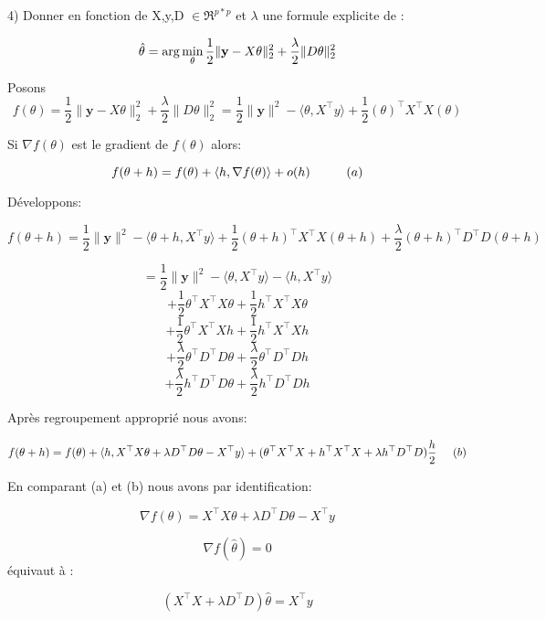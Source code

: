 4) Donner en fonction de X,y,D $\in {\Re}^{p*p}$  et $\lambda$ une formule  explicite de :

$$\hat \theta={\rm arg} \displaystyle\min_{\theta} \frac{1}{2}\| \mathbf{y} -X \theta \|_2^2+ \frac{\lambda}{2}\|D\theta\|_2^2$$

Posons $$ f(\theta) = \frac{1}{2}\| \mathbf{y} -X \theta \|_2^2+ \frac{\lambda}{2}\|D\theta\|_2^2 = \frac{1}{2}\| \mathbf{y}\|^2 - \langle \theta,X^\top y \rangle + \frac{1}{2} (\theta)^\top X^\top X (\theta)$$
       
Si  $\nabla f(\theta)$ est le gradient de $f(\theta)$ alors:


$$f(\theta + h)=f(\theta) +\langle h,\nabla f(\theta) \rangle  + o(h)   \hspace{5mm} \hspace{5mm} (a)$$ 


Développons:

$$f(\theta+ h)= \frac{1}{2}\| \mathbf{y}\|^2 - \langle \theta+h,X^\top y \rangle + \frac{1}{2} (\theta+h)^\top X^\top X (\theta+h)+ \frac{\lambda}{2}(\theta+h)^\top D^\top D (\theta+h)$$

$$=\frac{1}{2}\| \mathbf{y}\|^2-\langle \theta,X^\top y \rangle - \langle h,X^\top y \rangle$$
$$+\frac{1}{2} \theta^\top X^\top X \theta+\frac{1}{2} h^\top X^\top X \theta$$
$$+\frac{1}{2} \theta^\top X^\top X h+\frac{1}{2} h^\top X^\top X h $$
$$+ \frac{\lambda}{2} \theta^\top D^\top D \theta+\frac{\lambda}{2} \theta^\top D^\top D h$$
$$+\frac{\lambda}{2} h^\top D^\top D \theta +\frac{\lambda}{2} h^\top D^\top D h$$

Après regroupement approprié nous avons:

$$f(\theta+ h)= f(\theta)+\langle h,X^\top X \theta+\lambda D^\top D \theta - X^\top y \rangle+(\theta^\top X^\top X+h^\top X^\top X+\lambda h^\top D^\top D )\frac{h}{2} \hspace{5mm} (b)$$

En comparant (a) et (b) nous avons par identification:

$$\nabla f(\theta) = X^\top X \theta + \lambda D^\top D \theta - X^\top y $$

$$\nabla f(\hat \theta)=0$$ équivaut à :

$$(X^\top X + \lambda D^\top D)\hat \theta= X^\top y$$ 




